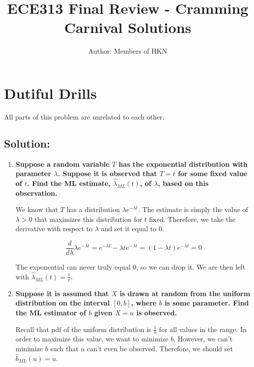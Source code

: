 \documentclass{article}
\title{ECE313 Final Review - Cramming Carnival Solutions}
\author{Author: Members of HKN}
\date{}
\begin{document}
\maketitle


\section{Dutiful Drills}

All parts of this problem are unrelated to each other.

\subsection{Solution:}

\begin{enumerate}[label=(\alph*)]
\itemsep0em
    \item \textbf{Suppose a random variable $T$ has the exponential distribution with parameter $\lambda$. Suppose it is observed that $T = t$ for some fixed value of $t$. Find the ML estimate, $\hat{\lambda}_{ML}(t)$, of $\lambda$, based on this observation.}

    We know that $T$ has a distribution $\lambda e^{-\lambda t}$. The estimate is simply the value of $\lambda > 0$ that maximizes this distribution for $t$ fixed. Therefore, we take the derivative with respect to $\lambda$ and set it equal to $0$.

    $$\frac{d}{d\lambda} \lambda e^{-\lambda t} = e^{-\lambda t} - \lambda te^{-\lambda t} = (1 - \lambda t)e^{-\lambda t} = 0$$

    The exponential can never truly equal $0$, so we can drop it. We are then left with $\boxed{\hat{\lambda}_{ML}(t) = \frac{1}{t}}$.

    \vspace{3cm}
    
    \item \textbf{Suppose it is assumed that $X$ is drawn at random from the uniform distribution on the interval $[0, b]$, where $b$ is some parameter. Find the ML estimator of $b$ given $X = u$ is observed.}

    Recall that pdf of the uniform distribution is $\frac{1}{b}$ for all values in the range. In order to maximize this value, we want to minimize $b$. However, we can't minimize $b$ such that $u$ can't even be observed. Therefore, we should set $\boxed{\hat{b}_{ML}(u) = u}$.

    \vspace{3cm}
    

\end{enumerate}
\end{document}
